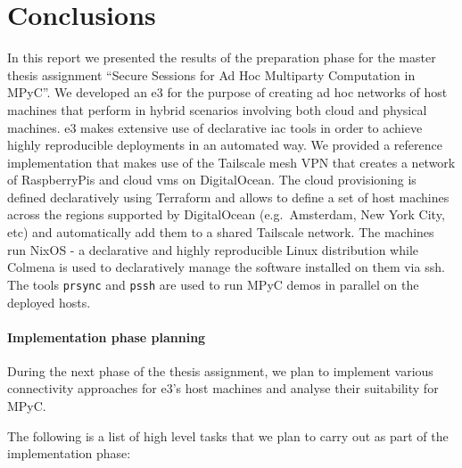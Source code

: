 \hypertarget{conclusions}{%
\chapter{Conclusions}\label{conclusions}}

In this report we presented the results of the preparation phase for the
master thesis assignment ``Secure Sessions for Ad Hoc Multiparty
Computation in MPyC''. We developed an \acrfull{e3} for the purpose of
creating ad hoc networks of host machines that perform 
in hybrid scenarios involving both cloud and physical machines. \gls{e3}
makes extensive use of declarative \gls{iac} tools in order to achieve
highly reproducible deployments in an automated way. We provided a
reference implementation that makes use of the Tailscale mesh VPN that
creates a network of RaspberryPis and cloud \glspl{vm} on DigitalOcean.
The cloud provisioning is defined declaratively using Terraform and
allows to define a set of host machines across the regions supported by
DigitalOcean (e.g.~Amsterdam, New York City, etc) and automatically add
them to a shared Tailscale network. The machines run NixOS - a
declarative and highly reproducible Linux distribution while Colmena is
used to declaratively manage the software installed on them via
\gls{ssh}. The tools \texttt{prsync} and \texttt{pssh} are used to run
MPyC demos in parallel on the deployed hosts.

\hypertarget{implementation-phase-planning}{%
\subsubsection{Implementation phase
planning}\label{implementation-phase-planning}}

During the next phase of the thesis assignment, we plan to implement
various connectivity approaches for \gls{e3}'s host machines and analyse
their suitability for MPyC.

The following is a list of high level tasks that we plan to carry out as
part of the implementation phase:

